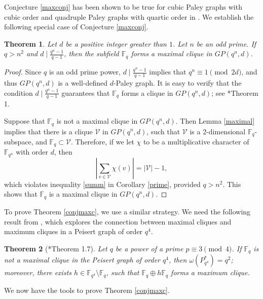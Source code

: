 \documentclass[12pt,reqno]{amsart}
\newtheorem{thm}{Theorem}[section]
\theoremstyle{definition}
\newcommand{\F}{\mathbb{F}}
\begin{document}
Conjecture \ref{maxconj} has been shown to be true for cubic Paley graphs with cubic order and quadruple Paley graphs with quartic order in \cite{Yip3}. We establish the following special case of Conjecture \ref{maxconj}.
\begin{thm}\label{maximalGP}
Let $d$ be a positive integer greater than $1$. Let $n$ be an odd prime. If $q>n^2$ and $d \mid \frac{q^n-1}{q-1}$, then the subfield $\F_q$ forms a maximal clique in $GP(q^n,d)$.
\end{thm}

\begin{proof}
Since $q$ is an odd prime power,  $d \mid \frac{q^n-1}{q-1}$ implies that $q^n \equiv 1 \pmod {2d}$, and thus $GP(q^n,d)$ is a well-defined $d$-Paley graph. It is easy to verify that the condition $d \mid \frac{q^n-1}{q-1}$ guarantees that $\F_q$ forms a clique in $GP(q^n,d)$; see \cite{BDR}*{Theorem 1}.

Suppose that $\F_q$ is not a maximal clique in $GP(q^n,d)$. Then Lemma \ref{maximal} implies that there is a clique $\mathcal{V}$ in $GP(q^n,d)$, such that $\mathcal{V}$ is a 2-dimensional $\F_q$-subspace, and $\F_q \subset \mathcal{V}$. Therefore, if we let $\chi$ to be a multiplicative character of $\F_{q^n}$ with order $d$, then 
\begin{equation} 
\left|\sum_{v \in \mathcal{V}} \chi(v)\right|=|\mathcal{V}|-1,    
\end{equation}
which violates inequality \eqref{summ} in Corollary \ref{prime}, provided $q>n^2$. This shows that $\F_q$ is a maximal clique in $GP(q^n,d)$.
\end{proof}

To prove Theorem \ref{conjmaxc}, we use a similar strategy. We need the following result from \cite{Yip3}, which explores the connection between maximal cliques and maximum cliques in a Peisert graph of order $q^4$.

\begin{thm}[\cite{Yip3}*{Theorem 1.7}]\label{maxP*}
Let $q$ be a power of a prime $p \equiv 3 \pmod 4$.  If $\F_{q}$ is not a maximal clique in the Peisert graph of order $q^4$, then $\omega(P^*_{q^4})=q^2$; moreover, there exists $h \in \F_{q^4} \setminus \F_{q}$, such that $\F_{q} \oplus h\F_{q}$ forms a maximum clique. 
\end{thm}


We now have the tools to prove Theorem \ref{conjmaxc}.
\end{document}
